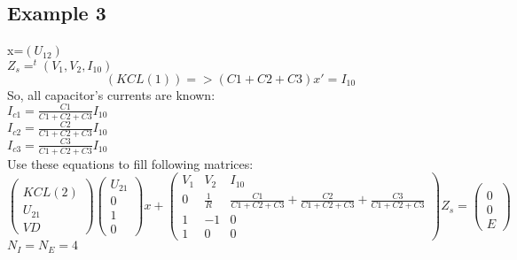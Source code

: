 \subsection{Example 3}
\begin{figure}[h]
\centerline{
 \scalebox{0.8}{
    
 }
}
\end{figure}

x=$(U_{12})$\\
$Z_{s}=^{t}(V_{1},V_{2},I_{10})$\\
\[(KCL(1))=>(C1+C2+C3)x'=I_{10}\]
So, all capacitor's currents are known:\\
$I_{c1}=\frac{C1}{C1+C2+C3}I_{10}$\\
$I_{c2}=\frac{C2}{C1+C2+C3}I_{10}$\\
$I_{c3}=\frac{C3}{C1+C2+C3}I_{10}$\\
Use these equations to fill following matrices:\\
\[\left(\begin{array}{c}
  \\
KCL(2)\\U_{21}\\VD
\end{array}\right)
\left(\begin{array}{c}
U_{21}\\
\hline
0\\
1\\
0
\end{array}\right)x+
\left(\begin{array}{ccc}
V_{1}&V_{2}&I_{10}\\
\hline
0&\frac{1}{R}&\frac{C1}{C1+C2+C3}+\frac{C2}{C1+C2+C3}+\frac{C3}{C1+C2+C3}\\
1&-1&0\\
1&0&0
\end{array}\right)Z_{s}=
\left(\begin{array}{c}
\\0\\0\\E
\end{array}\right)
\]
$N_{I}=N_{E}=4$
\newpage
